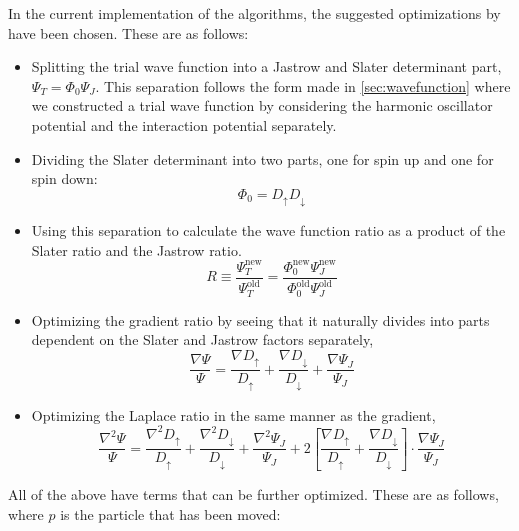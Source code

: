 \documentclass[aps,prb,twocolumn,floatfix]{revtex4}
\begin{document}
In the current implementation of the algorithms, the suggested optimizations by \textcite{lecturenotes} have been chosen. These are as follows:

\begin{itemize}
    \item Splitting the trial wave function into a Jastrow and Slater determinant part, $\Psi_T = \Phi_0 \Psi_J$. This separation follows the form made in \ref{sec:wavefunction} where we constructed a trial wave function by considering the harmonic oscillator potential and the interaction potential separately.
    \item Dividing the Slater determinant into two parts, one for spin up and one for spin down: 
    \begin{equation}
        \Phi_0 = D_{\uparrow} D_{\downarrow}    
    \end{equation} 
    \item Using this separation to calculate the wave function ratio as a product of the Slater ratio and the Jastrow ratio.
    \begin{equation}
        R \equiv \frac{\Psi_T^{\text{new}}}{\Psi_T^{\text{old}}} = \frac{\Phi_0^{\text{new}} \Psi_J^{\text{new}}}{\Phi_0^{\text{old}} \Psi_J^{\text{old}}}
    \end{equation}
    \item Optimizing the gradient ratio by seeing that it naturally divides into parts dependent on the Slater and Jastrow factors separately,
    \begin{equation}
        \frac{\nabla \Psi}{\Psi} = \frac{\nabla D_{\uparrow}}{D_{\uparrow}} + \frac{\nabla D_{\downarrow}}{D_{\downarrow}} + \frac{\nabla \Psi_J}{\Psi_J}
    \end{equation} 
    \item Optimizing the Laplace ratio in the same manner as the gradient,
    \begin{equation}
        \frac{\nabla^2 \Psi}{\Psi} = \frac{\nabla^2 D_{\uparrow}}{D_{\uparrow}} + \frac{\nabla^2 D_{\downarrow}}{D_{\downarrow}} + \frac{\nabla^2 \Psi_J}{\Psi_J} + 2 \left[ \frac{\nabla D_{\uparrow}}{D_{\uparrow}} + \frac{\nabla D_{\downarrow}}{D_{\downarrow}} \right] \cdot \frac{\nabla \Psi_J}{\Psi_J}
    \end{equation} 
\end{itemize}
All of the above have terms that can be further optimized. These are as follows, where $p$ is the particle that has been moved:
\end{document}

